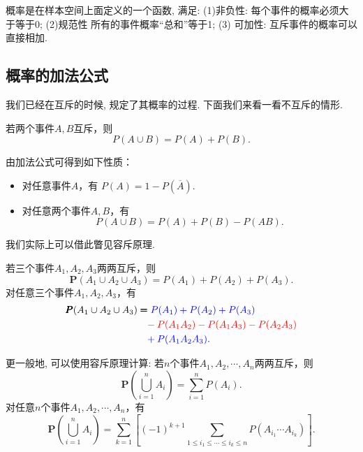 \begin{takeaway}
    概率是在样本空间上面定义的一个函数, 满足: (1)非负性: 每个事件的概率必须大于等于0; (2)规范性
    所有的事件概率``总和''等于1; (3) 可加性: 互斥事件的概率可以直接相加.
\end{takeaway}
    


\subsection{概率的加法公式}
我们已经在互斥的时候, 规定了其概率的过程. 下面我们来看一看不互斥的情形.
\begin{proposition}[加法公式]
    若两个事件$A,B$互斥，则
    $$P(A\cup B)=P(A)+P(B).$$
\end{proposition}

\begin{remark}
    由加法公式可得到如下性质：
    \begin{itemize}
        \item 对任意事件$A$，有
              $P(A)=1-P\left(\overline{A}\right).$
        \item 对任意两个事件$A,B$，有
              $$P(A\cup B)=P(A)+P(B)-P(AB).$$
    \end{itemize}
\end{remark}

\begin{asidebox}
    我们实际上可以借此瞥见容斥原理.
    \begin{remark}
        若三个事件$A_1, A_2, A_3$两两互斥，则
        $$\pmb P(A_1 \cup A_2 \cup A_3) = P(A_1)+P(A_2)+P(A_3).$$
        对任意三个事件$A_1, A_2, A_3$，有
        \begin{align*}
            \pmb P(A_1 \cup A_2 \cup A_3) & \pmb=\color{blue}P(A_1)+P(A_2)+P(A_3)              \\
                                          & \phantom=\color{red}-P(A_1A_2)-P(A_1A_3)-P(A_2A_3) \\
                                          & \phantom=\color{blue}+P(A_1A_2A_3).
        \end{align*}%
    \end{remark}

    \begin{remark}
        更一般地, 可以使用容斥原理计算:
        若$n$个事件$A_1, A_2, \cdots, A_n$两两互斥，则
        $$\pmb P\left( \bigcup_{i=1}^n A_i \right)=\sum_{i=1}^n P(A_i).$$
        \vspace{0.2in}
        对任意$n$个事件$A_1, A_2, \cdots, A_n$，有
        $$\pmb P\left( \bigcup_{i=1}^n A_i \right)=\sum_{k=1}^n \left[ (-1)^{k+1} \sum_{1\le i_1\le \cdots\le i_k \le n} P(A_{i_1}\cdots A_{i_k}) \right].$$
    \end{remark}


\end{asidebox}

